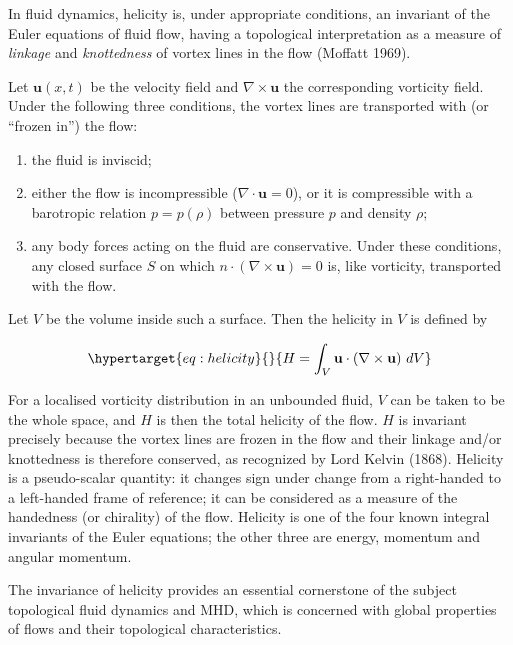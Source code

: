 \documentclass[
  notoc %
]{tufte-book}
\providecommand{\tightlist}{%
  \setlength{\itemsep}{0pt}\setlength{\parskip}{0pt}
}
\begin{document}
In fluid dynamics, helicity is, under appropriate conditions, an
invariant of the Euler equations of fluid flow, having a topological
interpretation as a measure of \emph{linkage} and \emph{knottedness} of
vortex lines in the flow (Moffatt 1969).

Let \(\mathbf{u}(x,t)\) be the velocity field and
\(\nabla\times\mathbf{u}\) the corresponding vorticity field. Under the
following three conditions, the vortex lines are transported with (or
``frozen in'') the flow:

\begin{enumerate}
\def\labelenumi{\arabic{enumi}.}
\tightlist
\item
  the fluid is inviscid;
\item
  either the flow is incompressible (\(\nabla\cdot\mathbf{u}=0\)), or it
  is compressible with a barotropic relation \(p=p(\rho)\) between
  pressure \(p\) and density \(\rho\);
\item
  any body forces acting on the fluid are conservative. Under these
  conditions, any closed surface \(S\) on which
  \(n\cdot(\nabla\times\mathbf{u})=0\) is, like vorticity, transported
  with the flow.
\end{enumerate}

Let \(V\) be the volume inside such a surface. Then the helicity in
\(V\) is defined by

\begin{equation}\protect\hypertarget{eq:helicity}{}{
H=\int_{{V}}{\mathbf{u}}\cdot\left(\nabla\times\mathbf{u}\right)\,dV
}\label{eq:helicity}\end{equation}

For a localised vorticity distribution in an unbounded fluid, \(V\) can
be taken to be the whole space, and \(H\) is then the total helicity of
the flow. \(H\) is invariant precisely because the vortex lines are
frozen in the flow and their linkage and/or knottedness is therefore
conserved, as recognized by Lord Kelvin (1868). Helicity is a
pseudo-scalar quantity: it changes sign under change from a right-handed
to a left-handed frame of reference; it can be considered as a measure
of the handedness (or chirality) of the flow. Helicity is one of the
four known integral invariants of the Euler equations; the other three
are energy, momentum and angular momentum.

The invariance of helicity provides an essential cornerstone of the
subject topological fluid dynamics and MHD, which is concerned with
global properties of flows and their topological characteristics.
\end{document}
